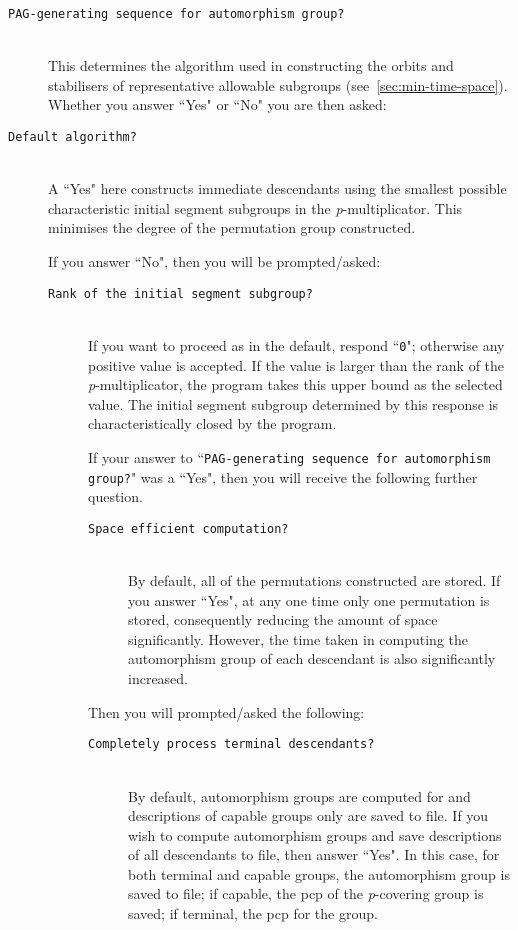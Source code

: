 \documentclass[12pt]{article}
\begin{document}
\begin{description}
\item[\texttt{PAG-generating sequence for automorphism group?}]\ \\
 This determines the algorithm used in constructing the orbits
 and stabilisers of representative allowable subgroups
 (see~\ref{sec:min-time-space}).
 Whether you answer ``Yes" or ``No" you are then asked:

\item[\texttt{Default algorithm?}]\ \\
 A ``Yes" here constructs immediate descendants using the smallest possible 
 characteristic initial segment subgroups in the {\it p}-multiplicator.
 This minimises the degree of the permutation group constructed. 

 If you answer ``No", then you will be prompted/asked:
 \begin{description}
  \item[\texttt{Rank of the initial segment subgroup?}]\ \\
   If you want to proceed as in the default, respond ``\texttt{0}"; 
   otherwise any positive value is accepted. If the value is 
   larger than the rank of the {\it p}-multiplicator, the program
   takes this upper bound as the selected value. The initial segment 
   subgroup determined by this response is characteristically  
   closed by the program.

   If your answer to
   ``\texttt{PAG-generating sequence for automorphism group?}"
   was a ``Yes", then 
   you will receive the following further question. 
   
   \begin{description}
    \item[\texttt{Space efficient computation?}]\ \\
     By default, all of the permutations constructed are stored.
     If you answer ``Yes", at any one time only one permutation is 
     stored, consequently reducing the amount of space significantly.
     However, the time taken in computing the automorphism group
     of each descendant is also significantly increased.
   \end{description}

   Then you will prompted/asked the following:

   \begin{description}
    \item[\texttt{Completely process terminal descendants?}]\ \\
     By default, automorphism groups are computed for and descriptions of 
     capable groups only are saved to file.  
     If you wish to compute automorphism groups and save descriptions of 
     all descendants to file, then answer ``Yes". In this case, 
     for both terminal and capable groups, the automorphism group is 
     saved to file;  if capable, the pcp of the {\it p}-covering group 
     is saved; if terminal, the pcp for the group.


\end{description}
\end{description}
\end{description}
\end{document}
